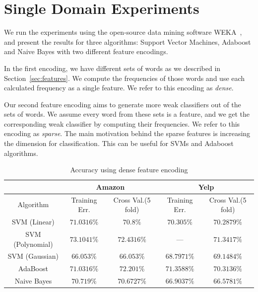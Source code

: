 \documentclass[letterpaper]{article}
\begin{document}
\section{Single Domain Experiments}
\label{sec:single_domain}  
We run the experiments using the open-source data mining software
WEKA~\cite{weka}, and present the results for three algorithms:
Support Vector Machines, Adaboost and Naive Bayes with two different
feature encodings.

In the first encoding, we have different sets of words as we described
in Section~\ref{sec:features}. We compute the frequencies of those
words and use each calculated frequency as a single feature. We refer to
this encoding as \emph{dense}.

Our second feature encoding aims to generate more weak classifiers out
of the sets of words. We assume every word from these sets is a
feature, and we get the corresponding weak classifier by computing
their frequencies. We refer to this encoding as \emph{sparse}. The
main motivation behind the sparse features is increasing the dimension
for classification. This can be useful for SVMs and Adaboost
algorithms.

\begin{table}[ht]
\centering
\begin{tabular}{c | c c | c c}
 & \multicolumn{2}{|c|}{Amazon} & \multicolumn{2}{|c}{Yelp} \\
\hline
Algorithm & Training Err. & Cross Val.(5 fold) & Training Err. & Cross Val.(5 fold)\\
\hline
SVM (Linear) 		& $71.0316\%$ & $70.8\%$ & $70.305\%$ & $70.2879\%$\\
SVM (Polynomial) 	& $73.1041\%$ & $72.4316\%$ & --- & $71.3417\%$\\
SVM (Gaussian) 		& $66.053\%$ & $66.053\%$ & $68.7971\%$ & $69.1484\%$\\
AdaBoost 			& $71.0316\%$ & $72.201\%$ & $71.3588\%$ & $70.3136\%$\\ 
Naive Bayes 		& $70.719\%$ & $70.6727\%$ & $66.9037\%$ & $66.5781\%$\\ 
\end{tabular}
\caption{Accuracy using dense feature encoding}
\label{tab:dense}
\end{table}
\end{document}
